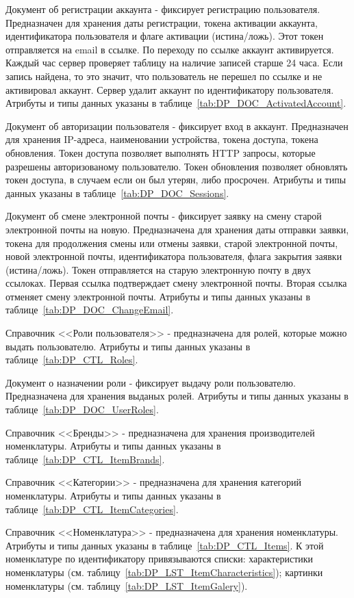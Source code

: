 Документ об регистрации аккаунта -
фиксирует регистрацию пользователя. Предназначен для хранения даты регистрации,
токена активации аккаунта, идентификатора пользователя и флаге активации (истина/ложь).
Этот токен отправляется на email в ссылке. По переходу по ссылке аккаунт активируется.
Каждый час сервер проверяет таблицу на наличие записей старше 24 часа.
Если запись найдена, то это значит, что пользователь не перешел по ссылке и не активировал аккаунт.
Сервер удалит аккаунт по идентификатору пользователя.
Атрибуты и типы данных указаны в таблице~\ref{tab:DP_DOC_ActivatedAccount}.

Документ об авторизации пользователя - фиксирует вход в аккаунт.
Предназначен для хранения IP-адреса, наименовании устройства, токена доступа, токена обновления.
Токен доступа позволяет выполнять HTTP запросы, которые разрешены авторизованому пользователю.
Токен обновления позволяет обновлять токен доступа, в случаем если он был утерян, либо просрочен.
Атрибуты и типы данных указаны в таблице~\ref{tab:DP_DOC_Sessions}.

Документ об смене электронной почты - фиксирует заявку на смену старой электронной почты на новую.
Предназначена для хранения даты отправки заявки, токена для продолжения смены или отмены заявки,
старой электронной почты, новой электронной почты,
идентификатора пользователя, флага закрытия заявки (истина/ложь).
Токен отправляется на старую электронную почту в двух ссылоках.
Первая ссылка подтверждает смену электронной почты.
Вторая ссылка отменяет смену электронной почты.
Атрибуты и типы данных указаны в таблице~\ref{tab:DP_DOC_ChangeEmail}.

Справочник <<Роли пользователя>> - предназначена для ролей, которые можно выдать пользователю.
Атрибуты и типы данных указаны в таблице~\ref{tab:DP_CTL_Roles}.

Документ о назначении роли - фиксирует выдачу роли пользователю.
Предназначена для хранения выданых ролей.
Атрибуты и типы данных указаны в таблице~\ref{tab:DP_DOC_UserRoles}.

Справочник <<Бренды>> - предназначена для хранения производителей номенклатуры.
Атрибуты и типы данных указаны в таблице~\ref{tab:DP_CTL_ItemBrands}.

Справочник <<Категории>> - предназначена для хранения категорий номенклатуры.
Атрибуты и типы данных указаны в таблице~\ref{tab:DP_CTL_ItemCategories}.

Справочник <<Номенклатура>> - предназначена для хранения номенклатуры.
Атрибуты и типы данных указаны в таблице~\ref{tab:DP_CTL_Items}.
К этой номенклатуре по идентификатору привязываются списки:
характеристики номенклатуры (см. таблицу~\ref{tab:DP_LST_ItemCharacteristics});
картинки номенклатуры (см. таблицу~\ref{tab:DP_LST_ItemGalery}).

